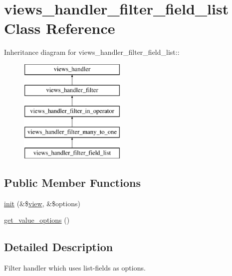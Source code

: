\hypertarget{classviews__handler__filter__field__list}{
\section{views\_\-handler\_\-filter\_\-field\_\-list Class Reference}
\label{classviews__handler__filter__field__list}
}
Inheritance diagram for views\_\-handler\_\-filter\_\-field\_\-list::\begin{figure}[H]
\begin{center}
\leavevmode
\includegraphics[height=5cm]{classviews__handler__filter__field__list}
\end{center}
\end{figure}
\subsection*{Public Member Functions}
\begin{DoxyCompactItemize}
\item 
\hyperlink{classviews__handler__filter__field__list_a0c04261667d87e0a74c2036a6a62ee75}{init} (\&\$\hyperlink{classview}{view}, \&\$options)
\item 
\hyperlink{classviews__handler__filter__field__list_aa3c5646f92d230f6c9ac61d483ee60aa}{get\_\-value\_\-options} ()
\end{DoxyCompactItemize}


\subsection{Detailed Description}
Filter handler which uses list-\/fields as options. 

